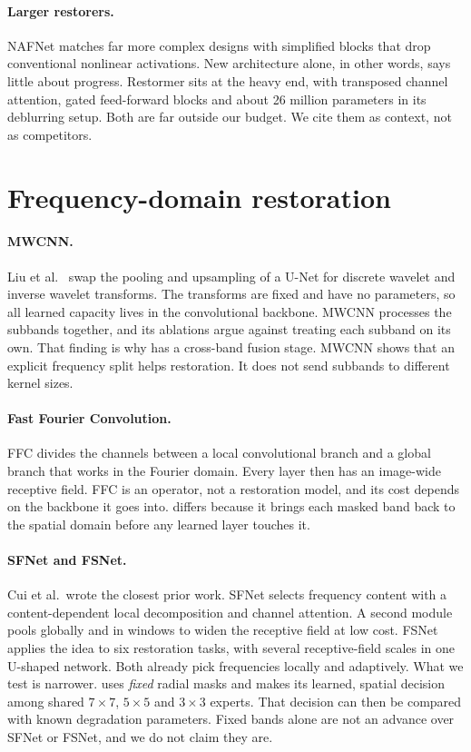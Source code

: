\paragraph{Larger restorers.} NAFNet \cite{chen2022nafnet} matches far more
complex designs with simplified blocks that drop conventional nonlinear
activations. New architecture alone, in other words, says little about
progress. Restormer \cite{zamir2022restormer} sits at the heavy end, with
transposed channel attention, gated feed-forward blocks and about 26 million
parameters in its deblurring setup. Both are far outside our budget. We cite
them as context, not as competitors.

\section{Frequency-domain restoration}\label{sec:lit-freq}

\paragraph{MWCNN.} Liu et al.\ \cite{liu2018mwcnn} swap the pooling and
upsampling of a U-Net for discrete wavelet and inverse wavelet transforms.
The transforms are fixed and have no parameters, so all learned capacity
lives in the convolutional backbone. MWCNN processes the subbands together,
and its ablations argue against treating each subband on its own. That
finding is why \fcsg{} has a cross-band fusion stage. MWCNN shows that an
explicit frequency split helps restoration. It does not send subbands to
different kernel sizes.

\paragraph{Fast Fourier Convolution.} FFC \cite{chi2020ffc} divides the
channels between a local convolutional branch and a global branch that works
in the Fourier domain. Every layer then has an image-wide receptive field.
FFC is an operator, not a restoration model, and its cost depends on the
backbone it goes into. \fcsg{} differs because it brings each masked band
back to the spatial domain before any learned layer touches it.

\paragraph{SFNet and FSNet.} Cui et al.\ wrote the closest prior work.
SFNet \cite{cui2023sfnet} selects frequency content with a content-dependent
local decomposition and channel attention. A second module pools globally and
in windows to widen the receptive field at low cost. FSNet \cite{cui2024fsnet}
applies the idea to six restoration tasks, with several receptive-field
scales in one U-shaped network. Both already pick frequencies locally and
adaptively. What we test is narrower. \fcsg{} uses \emph{fixed} radial masks
and makes its learned, spatial decision among shared $7\times7$, $5\times5$
and $3\times3$ experts. That decision can then be compared with known
degradation parameters. Fixed bands alone are not an advance over SFNet or
FSNet, and we do not claim they are.

